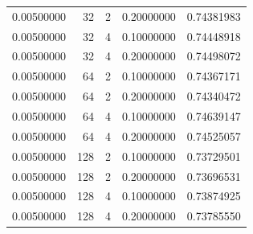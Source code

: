 \begin{table}[htbp]
{\begin{tabular}{rrrrr}
0.00500000 & 32 & 2 & 0.20000000 & 0.74381983 \\
0.00500000 & 32 & 4 & 0.10000000 & 0.74448918 \\
0.00500000 & 32 & 4 & 0.20000000 & 0.74498072 \\
0.00500000 & 64 & 2 & 0.10000000 & 0.74367171 \\
0.00500000 & 64 & 2 & 0.20000000 & 0.74340472 \\
0.00500000 & 64 & 4 & 0.10000000 & 0.74639147 \\
0.00500000 & 64 & 4 & 0.20000000 & 0.74525057 \\
0.00500000 & 128 & 2 & 0.10000000 & 0.73729501 \\
0.00500000 & 128 & 2 & 0.20000000 & 0.73696531 \\
0.00500000 & 128 & 4 & 0.10000000 & 0.73874925 \\
0.00500000 & 128 & 4 & 0.20000000 & 0.73785550 \\
\hline
\end{tabular}
}
\end{table}
